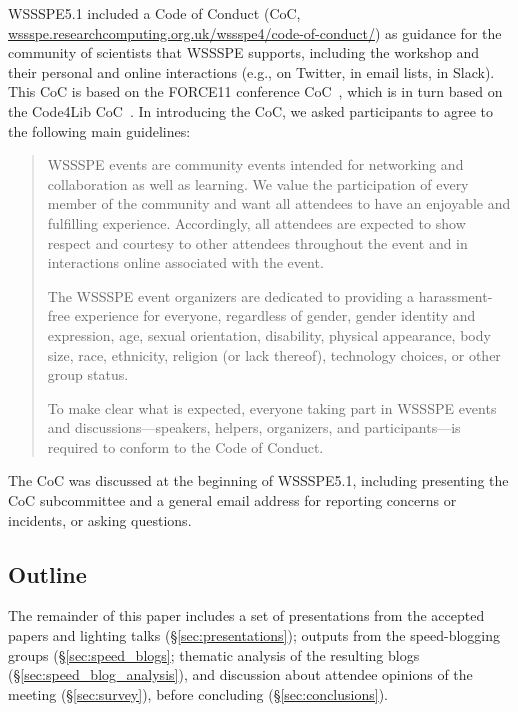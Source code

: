 \documentclass[11pt,letterpaper]{article}
\begin{document}
WSSSPE5.1 included a Code of Conduct (CoC, \href{http://wssspe.researchcomputing.org.uk/wssspe4/code-of-conduct/}{wssspe.researchcomputing.org.uk/wssspe4/code-of-conduct/}) as guidance for the community of scientists that WSSSPE
supports, including the workshop and their personal and online interactions (e.g., on
Twitter, in email lists, in Slack). This CoC is based on the
FORCE11 conference CoC~\cite{FORCE11:CoC}, which is in turn based on the Code4Lib
CoC~\cite{Code4Lib:CoC}.
In introducing the CoC, we asked participants to agree to the following main guidelines:
\begin{quote}
    WSSSPE events are community events intended for networking and collaboration
    as well as learning. We value the participation of every member of the
    community and want all attendees to have an enjoyable and fulfilling
    experience. Accordingly, all attendees are expected to show respect and
    courtesy to other attendees throughout the event and in interactions online
    associated with the event.

    The WSSSPE event organizers are dedicated to providing a harassment-free
    experience for everyone, regardless of gender, gender identity and
    expression, age, sexual orientation, disability, physical appearance,
    body size, race, ethnicity, religion (or lack thereof), technology choices,
    or other group status.

    To make clear what is expected, everyone taking part in WSSSPE events and
    discussions---speakers, helpers, organizers, and participants---is required
    to conform to the Code of Conduct.

 \end{quote}

The CoC was discussed at the beginning of WSSSPE5.1, including presenting the CoC subcommittee
and a general email address for reporting concerns or incidents, or
asking questions.



\subsection{Outline}
The remainder of this paper includes %
a set of presentations from the accepted papers and lighting talks (\S\ref{sec:presentations}); outputs from the speed-blogging groups (\S\ref{sec:speed_blogs};  thematic analysis of the resulting blogs (\S\ref{sec:speed_blog_analysis}), and discussion about attendee opinions of the meeting (\S\ref{sec:survey}), before concluding (\S\ref{sec:conclusions}).
\end{document}
